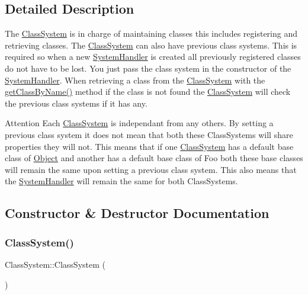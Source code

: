 \subsection{Detailed Description}
The \hyperlink{classClassSystem}{Class\+System} is in charge of maintaining classes this includes registering and retrieving classes. The \hyperlink{classClassSystem}{Class\+System} can also have previous class systems. This is required so when a new \hyperlink{classSystemHandler}{System\+Handler} is created all previously registered classes do not have to be lost. You just pass the class system in the constructor of the \hyperlink{classSystemHandler}{System\+Handler}. When retrieving a class from the \hyperlink{classClassSystem}{Class\+System} with the \hyperlink{classClassSystem_a4b88087eed035dc1f6100850c933ae84}{get\+Class\+By\+Name()} method if the class is not found the \hyperlink{classClassSystem}{Class\+System} will check the previous class systems if it has any. \begin{DoxyAttention}{Attention}
Each \hyperlink{classClassSystem}{Class\+System} is independant from any others. By setting a previous class system it does not mean that both these Class\+Systems will share properties they will not. This means that if one \hyperlink{classClassSystem}{Class\+System} has a default base class of \hyperlink{classObject}{Object} and another has a default base class of Foo both these base classes will remain the same upon setting a previous class system. This also means that the \hyperlink{classSystemHandler}{System\+Handler} will remain the same for both Class\+Systems. 
\end{DoxyAttention}


\subsection{Constructor \& Destructor Documentation}
\mbox{\label{classClassSystem_aaaec70fea8c72ed8c47bfb4de3fc4b46}} 
\subsubsection{\texorpdfstring{Class\+System()}{ClassSystem()}}
{\footnotesize\ttfamily Class\+System\+::\+Class\+System (\begin{DoxyParamCaption}{ }\end{DoxyParamCaption})}

